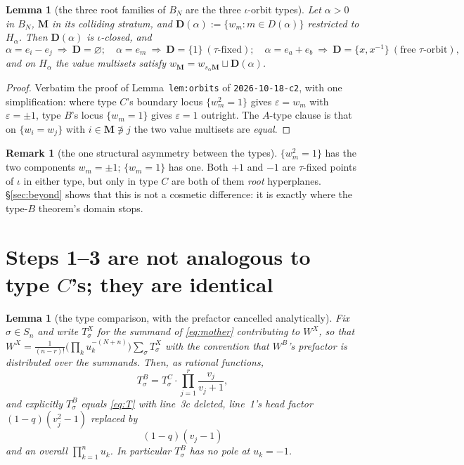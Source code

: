 \documentclass[11pt]{article}
\newtheorem{lem}[thm]{Lemma}
\theoremstyle{definition}
\newtheorem{rem}[thm]{Remark}
\newcommand{\bM}{\mathbf{M}}
\newcommand{\bD}{\mathbf{D}}
\begin{document}
\begin{lem}[the three root families of $B_N$ are the three $\iota$-orbit types]
\label{lem:orbits}
Let $\alpha>0$ in $B_N$, $\bM$ in its colliding stratum, and
$\bD(\alpha):=\{w_m:m\in D(\alpha)\}$ restricted to $H_\alpha$.  Then
$\bD(\alpha)$ is $\iota$-closed, and
\[
  \alpha=e_i-e_j\ \Rightarrow\ \bD=\varnothing;\quad
  \alpha=e_m\ \Rightarrow\ \bD=\{1\}\ (\tau\text{-fixed});\quad
  \alpha=e_a+e_b\ \Rightarrow\ \bD=\{x,x^{-1}\}\ (\text{free }\tau\text{-orbit}),
\]
and on $H_\alpha$ the value multisets satisfy
$w_{\bM}=w_{s_\alpha\bM}\sqcup\bD(\alpha)$.
\end{lem}

\begin{proof}
Verbatim the proof of Lemma~\texttt{lem:orbits} of \texttt{2026-10-18-c2}, with
one simplification: where type $C$'s boundary locus $\{w_m^{2}=1\}$ gives
$\varepsilon=w_m$ with $\varepsilon=\pm1$, type $B$'s locus $\{w_m=1\}$ gives
$\varepsilon=1$ outright.  The $A$-type clause is that on $\{w_i=w_j\}$ with
$i\in\bM\not\ni j$ the two value multisets are \emph{equal}.
\end{proof}

\begin{rem}[the one structural asymmetry between the types]
\label{rem:components}
$\{w_m^{2}=1\}$ has the two components $w_m=\pm1$; $\{w_m=1\}$ has one.  Both
$+1$ and $-1$ are $\tau$-fixed points of $\iota$ in either type, but only in
type $C$ are both of them \emph{root} hyperplanes.  \S\ref{sec:beyond} shows
that this is not a cosmetic difference: it is exactly where the type-$B$
theorem's domain stops.
\end{rem}

\section{Steps 1--3 are not analogous to type $C$'s; they are identical}
\label{sec:proof}

\begin{lem}[the type comparison, with the prefactor cancelled analytically]
\label{lem:typecompare}
Fix $\sigma\in S_n$ and write $T^{X}_\sigma$ for the summand of
\eqref{eq:mother} contributing to $W^{X}$, so that
$W^{X}=\frac{1}{(n-r)!}\bigl(\prod_k u_k^{-(N+n)}\bigr)\sum_\sigma T^{X}_\sigma$
with the convention that $W^{B}$'s prefactor is distributed over the summands.
Then, as rational functions,
\[
  T^{B}_\sigma=T^{C}_\sigma\cdot\prod_{j=1}^{r}\frac{v_j}{v_j+1},
\]
and explicitly $T^{B}_\sigma$ equals \eqref{eq:T} with line~3c deleted, line~1's
head factor $(1-q)(v_j^{2}-1)$ replaced by
\[
  \boxed{\ (1-q)(v_j-1)\ }
\]
and an overall $\prod_{k=1}^{n}u_k$.  In particular $T^{B}_\sigma$ has no pole at
$u_k=-1$.
\end{lem}
\end{document}

